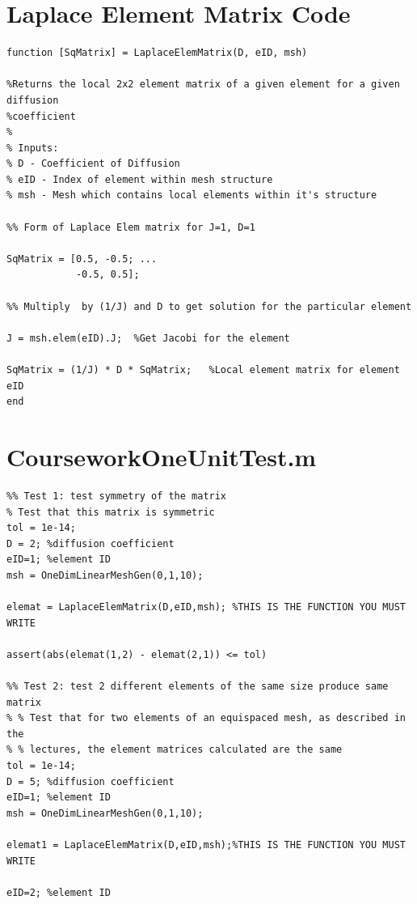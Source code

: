 \documentclass[11pt]{article}
\begin{document}
\begin{appendices}
\section{Laplace Element Matrix Code}\label{ap:LaplaceElem}
\begin{lstlisting}
function [SqMatrix] = LaplaceElemMatrix(D, eID, msh)

%Returns the local 2x2 element matrix of a given element for a given diffusion
%coefficient
%
% Inputs: 
% D - Coefficient of Diffusion
% eID - Index of element within mesh structure
% msh - Mesh which contains local elements within it's structure

%% Form of Laplace Elem matrix for J=1, D=1

SqMatrix = [0.5, -0.5; ...
            -0.5, 0.5];

%% Multiply  by (1/J) and D to get solution for the particular element

J = msh.elem(eID).J;  %Get Jacobi for the element

SqMatrix = (1/J) * D * SqMatrix;   %Local element matrix for element eID
end

\end{lstlisting}
\pagebreak

\section{CourseworkOneUnitTest.m}
\label{ap:CW1}
\begin{lstlisting}
%% Test 1: test symmetry of the matrix
% Test that this matrix is symmetric
tol = 1e-14;
D = 2; %diffusion coefficient
eID=1; %element ID
msh = OneDimLinearMeshGen(0,1,10);

elemat = LaplaceElemMatrix(D,eID,msh); %THIS IS THE FUNCTION YOU MUST WRITE

assert(abs(elemat(1,2) - elemat(2,1)) <= tol)

%% Test 2: test 2 different elements of the same size produce same matrix
% % Test that for two elements of an equispaced mesh, as described in the
% % lectures, the element matrices calculated are the same
tol = 1e-14;
D = 5; %diffusion coefficient
eID=1; %element ID
msh = OneDimLinearMeshGen(0,1,10);

elemat1 = LaplaceElemMatrix(D,eID,msh);%THIS IS THE FUNCTION YOU MUST WRITE

eID=2; %element ID


\end{lstlisting}
\end{appendices}
\end{document}

